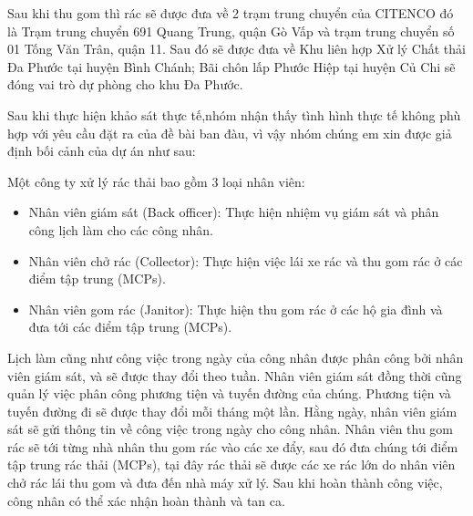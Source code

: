         \quad Sau khi thu gom thì rác sẽ được đưa về 2 trạm trung chuyển của CITENCO đó là Trạm trung chuyển 691 Quang Trung, quận Gò Vấp và trạm trung chuyển số 01 Tống Văn Trân, quận 11. Sau đó sẽ được đưa về Khu liên hợp Xử lý Chất thải Đa Phước tại huyện Bình Chánh; Bãi chôn lấp Phước Hiệp tại huyện Củ Chi sẽ đóng vai trò dự phòng cho khu Đa Phước. 

        \quad Sau khi thực hiện khảo sát thực tế,nhóm nhận thấy tình hình thực tế không phù hợp với yêu cầu đặt ra của đề bài ban đàu, vì vậy nhóm chúng em xin được giả định bối cảnh của dự án như sau:
        
        \quad Một công ty xử lý rác thải bao gồm 3 loại nhân viên:
        \begin{itemize}
            \item Nhân viên giám sát (Back officer): Thực hiện nhiệm vụ giám sát và phân công lịch làm cho các công nhân.
            \item Nhân viên chở rác (Collector): Thực hiện việc lái xe rác và thu gom rác ở các điểm tập trung (MCPs).
            \item Nhân viên gom rác (Janitor): Thực hiện thu gom rác ở các hộ gia đình và đưa tới các điểm tập trung (MCPs).
        \end{itemize}
        
        \quad Lịch làm cũng như công việc trong ngày của công nhân được phân công bởi nhân viên giám sát, và sẽ được thay đổi theo tuần. Nhân viên giám sát đồng thời cũng quản lý việc phân công phương tiện và tuyến đường của chúng. Phương tiện và tuyến đường đi sẽ được thay đổi mỗi tháng một lần. Hằng ngày, nhân viên giám sát sẽ gửi thông tin về công việc trong ngày cho công nhân. Nhân viên thu gom rác sẽ tới từng nhà nhân thu gom rác vào các xe đẩy, sau đó đưa chúng tới điểm tập trung rác thải (MCPs), tại đây rác thải sẽ được các xe rác lớn do nhân viên chở rác lái thu gom và đưa đến nhà máy xử lý. Sau khi hoàn thành công việc, công nhân có thể xác nhận hoàn thành và tan ca.





